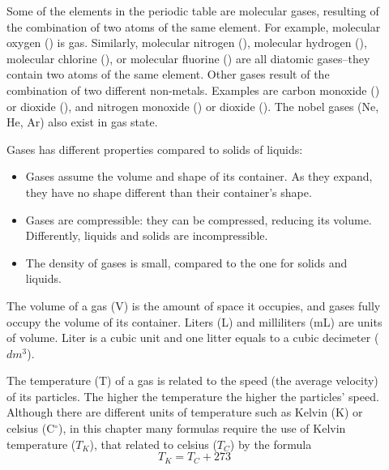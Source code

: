 \documentclass[main.tex]{subfiles}
\begin{document}
\sloppy 
\begin{description}
\item[] 
Some of the elements in the periodic table are molecular gases, resulting of the combination of two atoms of the same element. For example, molecular oxygen () is gas. Similarly, molecular nitrogen (), molecular hydrogen (), molecular chlorine (), or molecular fluorine () are all diatomic gases--they contain two atoms of the same element. Other gases result of the combination of two different non-metals. Examples are carbon monoxide () or dioxide (), and nitrogen monoxide () or dioxide (). The nobel gases (Ne, He, Ar) also exist in gas state.


\item[] 
Gases has different properties compared to solids of liquids:
\begin{itemize}
\item  Gases assume the volume and shape of its container. As they expand, they have no shape different than their container's shape.
\item Gases are compressible: they can be compressed, reducing its volume. Differently, liquids and solids are incompressible.
\item  The density of gases is small, compared to the one for solids and liquids.
\end{itemize}


 
\item[] The volume of a gas (V) is the amount of space it occupies, and gases fully occupy the volume of its container. Liters (L) and milliliters (mL) are units of volume. Liter is a cubic unit and one litter equals to a cubic decimeter ($dm^3$). 
\item[] The temperature (T) of a gas is related to the speed (the average velocity) of its particles. The higher the temperature the higher the particles' speed. Although there are different units of temperature such as Kelvin (K) or celsius (C$^{\circ}$), in this chapter many formulas require the use of Kelvin temperature ($T_K$), that related to celsius ($T_C$) by the formula
\begin{equation*}
\boxed{   T_K=T_C+273}   
\end{equation*}


\end{description}
\end{document}
